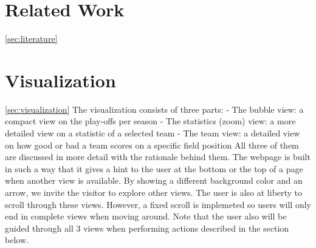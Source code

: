 \documentclass{sigchi}
\begin{document}
\section{Related Work}\ref{sec:literature}


\section{Visualization}\ref{sec:visualization}
The visualization consists of three parts:
- The bubble view: a compact view on the play-offs per season
- The statistics (zoom) view: a more detailed view on a statistic of a selected 
team
- The team view: a detailed view on how good or bad a team scores on a specific 
field position
All three of them are discussed in more detail with the rationale behind them.
The webpage is built in such a way that it gives a hint to the user at the bottom
or the top of a page when another view is available. By showing a different 
background color and an arrow, we invite the visitor to explore other views. The 
user is also at liberty to scroll through these views. However, a fixed scroll is
implemeted so users will only end in complete views when moving around. Note that 
the user also will be guided through all 3 views when performing actions described 
in the section below.
\end{document}
